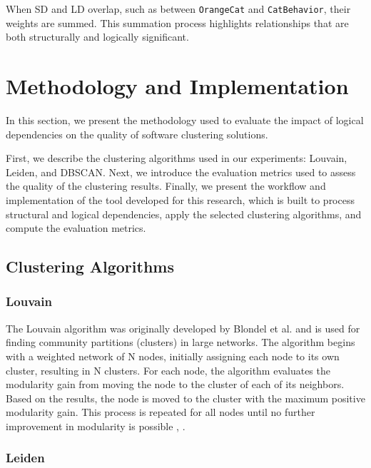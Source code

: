 \documentclass{ieeeaccess}
\begin{document}
When SD and LD overlap, such as between \texttt{OrangeCat} and \texttt{CatBehavior}, their weights are summed. This summation process highlights relationships that are both structurally and logically significant.





\section{Methodology and Implementation}
\label{sec:methodology_implementation}

In this section, we present the methodology used to evaluate the impact of logical dependencies on the quality of software clustering solutions.

First, we describe the clustering algorithms used in our experiments: Louvain, Leiden, and DBSCAN. Next, we introduce the evaluation metrics used to assess the quality of the clustering results. Finally, we present the workflow and implementation of the tool developed for this research, which is built to process structural and logical dependencies, apply the selected clustering algorithms, and compute the evaluation metrics.

\subsection{Clustering Algorithms}
\subsubsection{Louvain}
\label{subsubsec:louvain}

The Louvain algorithm was originally developed by Blondel et al. and is used for finding community partitions (clusters) in large networks. The algorithm begins with a weighted network of N nodes, initially assigning each node to its own cluster, resulting in N clusters. For each node, the algorithm evaluates the modularity gain from moving the node to the cluster of each of its neighbors. Based on the results, the node is moved to the cluster with the maximum positive modularity gain. This process is repeated for all nodes until no further improvement in modularity is possible \cite{b8}, \cite{b9}.

\subsubsection{Leiden}
\label{subsubsec:leiden}
\end{document}
